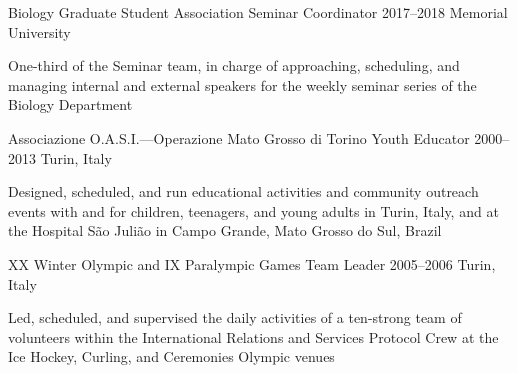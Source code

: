 \begin{cventries}
  \cventry
    {Biology Graduate Student Association} %
    {Seminar Coordinator} %
    {2017--2018} %
    {Memorial University} %
    {
      \begin{cvitems} %
        \item {One-third of the Seminar team, in charge of approaching, scheduling, and managing internal and external speakers for the weekly seminar series of the Biology Department}
      \end{cvitems}
    }

  \cventry
    {Associazione O.A.S.I.---Operazione Mato Grosso di Torino} %
    {Youth Educator} %
    {2000--2013} %
    {Turin, Italy} %
    {
      \begin{cvitems} %
        \item {Designed, scheduled, and run educational activities and community outreach events with and for children, teenagers, and young adults in Turin, Italy, and at the Hospital S{\~a}o Juli{\~a}o in Campo Grande, Mato Grosso do Sul, Brazil}
      \end{cvitems}
    }

\cventry
    {XX Winter Olympic and IX Paralympic Games} %
    {Team Leader} %
    {2005--2006} %
    {Turin, Italy} %
    {
      \begin{cvitems} %
        \item {Led, scheduled, and supervised the daily activities of a ten-strong team of volunteers within the International Relations and Services Protocol Crew at the Ice Hockey, Curling, and Ceremonies Olympic venues}
      \end{cvitems}
    }

\end{cventries}
